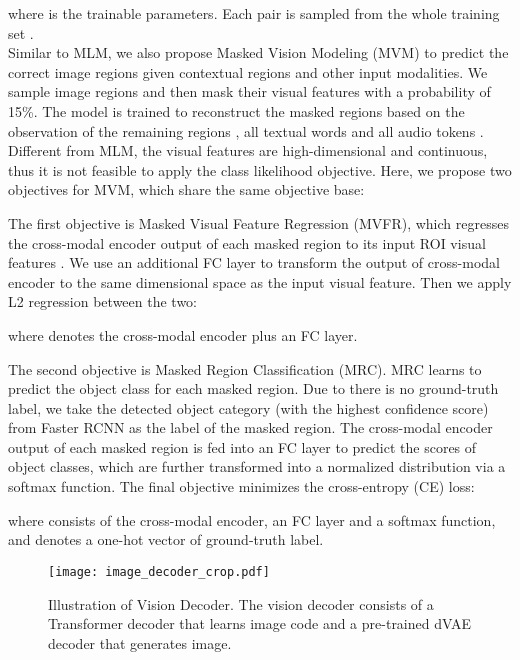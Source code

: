 \documentclass[10pt,twocolumn,letterpaper]{article}
\begin{document}
where  is the trainable parameters. Each pair  is sampled from the whole training set .  \\

 Similar to MLM, we also propose Masked Vision Modeling (MVM) to predict the correct image regions given contextual regions and other input modalities. We sample image regions and then mask their visual features with a probability of 15\%. The model is trained to reconstruct the masked regions  based on the observation of the remaining regions , all textual words  and all audio tokens . Different from MLM, the visual features are high-dimensional and continuous, thus it is not feasible to apply the class likelihood objective. Here, we propose two objectives for MVM, which share the same objective base:
  

The first objective is Masked Visual Feature Regression (MVFR), which regresses the cross-modal encoder output of each masked region  to its input ROI visual features . We use an additional FC layer to transform the output of cross-modal encoder to the same dimensional space as the input visual feature. Then we apply L2 regression between the two: 

where  denotes the cross-modal encoder plus an FC layer.

The second objective is Masked Region Classification (MRC). MRC learns to predict the object class for each masked region. Due to there is no ground-truth label, we take the detected object category (with the highest confidence score) from Faster RCNN as the label of the masked region. The cross-modal encoder output of each masked region is fed into an FC layer to predict the scores of object classes, which are further transformed into a normalized distribution via a softmax function. The final objective minimizes the cross-entropy (CE) loss:

where  consists of the cross-modal encoder, an FC layer and a softmax function, and  denotes a one-hot vector of ground-truth label. \\

\begin{figure}[t]
\begin{center}
\texttt{[image: image\_decoder\_crop.pdf]}
\end{center}
  \caption{Illustration of Vision Decoder. The vision decoder consists of a Transformer decoder that learns image code and a pre-trained dVAE decoder that generates image.}
\label{fig:img_deco}
\end{figure}
\end{document}
